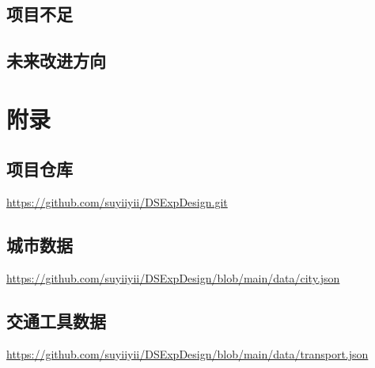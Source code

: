 \documentclass[10pt]{article}
\begin{document}
    \subsection{项目不足}

    \subsection{未来改进方向}

    \appendix


    \section{附录}

    \subsection{项目仓库}
    \href{https://github.com/suyiiyii/DSExpDesign.git}{https://github.com/suyiiyii/DSExpDesign.git} \label{项目仓库}

    \subsection{城市数据}
    \href{https://github.com/suyiiyii/DSExpDesign/blob/main/data/city.json}{https://github.com/suyiiyii/DSExpDesign/blob/main/data/city.json} \label{city_data}

    \subsection{交通工具数据}
    \href{https://github.com/suyiiyii/DSExpDesign/blob/main/data/transport.json}{https://github.com/suyiiyii/DSExpDesign/blob/main/data/transport.json} \label{transport_data}
\end{document}
